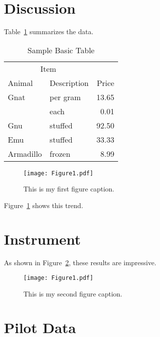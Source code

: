 \documentclass[man]{apa7}
\begin{document}
\section{Discussion}


Table~\ref{tab:BasicTable} summarizes the data. 

\begin{table}
  \caption{Sample Basic Table}
  \label{tab:BasicTable}
  \begin{tabular}{@{}llr@{}}         \toprule
  \multicolumn{2}{c}{Item}        \\ \cmidrule(r){1-2}
  Animal    & Description & Price \\ \midrule
  Gnat      & per gram    & 13.65 \\
            & each        &  0.01 \\
  Gnu       & stuffed     & 92.50 \\
  Emu       & stuffed     & 33.33 \\
  Armadillo & frozen      &  8.99 \\ \bottomrule
  \end{tabular}
\end{table}

\begin{figure}
    \caption{This is my first figure caption.}
    \texttt{[image: Figure1.pdf]}
    \label{fig:Figure1}
\end{figure}

Figure~\ref{fig:Figure1} shows this trend. \lipsum[16]


\section{Instrument}
\label{app:instrument}

As shown in Figure~\ref{fig:Figure2}, these results are impressive. 

\begin{figure}
    \caption{This is my second figure caption.}
    \texttt{[image: Figure1.pdf]}
    \label{fig:Figure2}
\end{figure}


\section{Pilot Data}
\label{app:surveydata}
\end{document}
